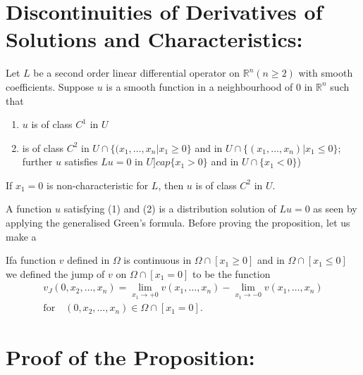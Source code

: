\section*{Discontinuities of Derivatives of Solutions and Characteristics:}

\begin{prop*}
Let $L$ be a second order linear differential operator on $\mathbb{R}^{n}(n\geq 2)$ with smooth coefficients. Suppose $u$ is a smooth function in a neighbourhood of 0 in $\mathbb{R}^{n}$ such that
\begin{enumerate}
\renewcommand{\labelenumi}{\rm(\theenumi)}
\item $u$ is of class $C^{1}$ in $U$

\item is of class $C^{2}$ in $U\cap \{(x_{1},\ldots,x_{n}|x_{1}\geq 0\}$ and in $U\cap \{(x_{1},\ldots,x_{n})|x_{1}\leq 0\}$; further $u$ satisfies $Lu=0$ in $U]cap \{x_{1}>0\}$ and in $U\cap \{x_{1}<0\}$)
\end{enumerate}
If $x_{1}=0$ is non-characteristic for $L$, then $u$ is of class $C^{2}$ in $U$.
\end{prop*}

\begin{remark*}
A function $u$ satisfying (1) and (2) is a distribution solution of $Lu=0$ as seen by applying the generalised Green's formula. Before proving the proposition, let us make a
\end{remark*}

\begin{defi*}
If\pageoriginale a function $v$ defined in $\Omega$ is continuous in $\Omega\cap [x_{1}\geq 0]$ and in $\Omega\cap [x_{1}\leq 0]$ we defined the jump of $v$ on $\Omega\cap [x_{1}=0]$ to be the function
\begin{gather*}
v_{J}(0,x_{2},\ldots,x_{n})=\lim\limits_{x_{1}\to +0}v(x_{1},\ldots,x_{n})-\lim\limits_{x_{1}\to -0}v(x_{1},\ldots,x_{n})\\[3pt]
\text{for}\quad (0,x_{2},\ldots,x_{n})\in \Omega \cap [x_{1}=0].
\end{gather*}
\end{defi*}

\section*{Proof of the Proposition:}

